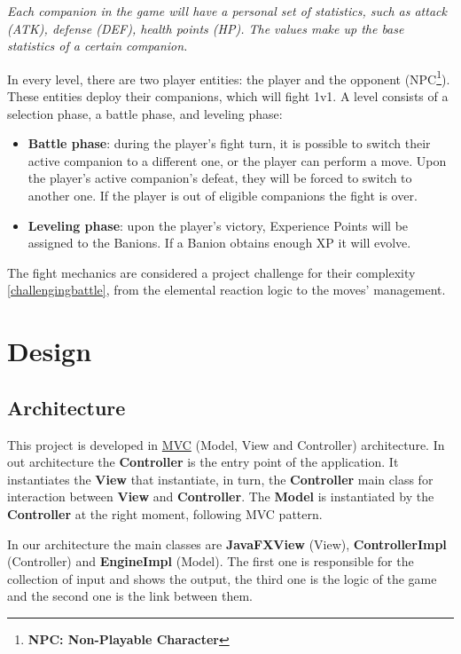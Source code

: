\documentclass[12pt, a4paper]{report}
\theoremstyle{definition}
\begin{document}
    \textit{Each companion in the game will have a personal set of statistics, such as attack (ATK), defense (DEF), health points (HP).
    The values make up the base statistics of a certain companion.}

    In every level, there are two player entities: the player and the opponent (NPC\footnote{\textbf{NPC: Non-Playable Character}}). These entities deploy their companions, which will fight 1v1.
    A level consists of a selection phase, a battle phase, and leveling phase:
\begin{itemize}
    \item \textbf{Battle phase}: during the player's fight turn, it is possible to switch their active companion to a different one, 
        or the player can perform a move. Upon the player's active companion's defeat, they will be forced to switch to another one. 
        If the player is out of eligible companions the fight is over.
    \item \textbf{Leveling phase}: upon the player's victory, Experience Points will be assigned to the Banions. If a Banion obtains enough XP it will evolve.
\end{itemize}

    The fight mechanics are considered a project challenge for their complexity \ref{challengingbattle}, from the elemental reaction logic to the moves' management.

\chapter{Design}

\section{Architecture}

    This project is developed in \href{https://en.wikipedia.org/wiki/Model%E2%80%93view%E2%80%93controller}{MVC} (Model, View and Controller) architecture.
    In out architecture the \textbf{Controller} is the entry point of the application. It instantiates the \textbf{View} that instantiate, in turn, the
    \textbf{Controller} main class for interaction between \textbf{View} and \textbf{Controller}. The \textbf{Model} is instantiated by the \textbf{Controller}
    at the right moment, following MVC pattern.

    In our architecture the main classes are \textbf{JavaFXView} (View), \textbf{ControllerImpl} (Controller) and \textbf{EngineImpl} (Model). The
    first one is responsible for the collection of input and shows the output, the third one is the logic of the game and the second one is the link between them.
\end{document}
